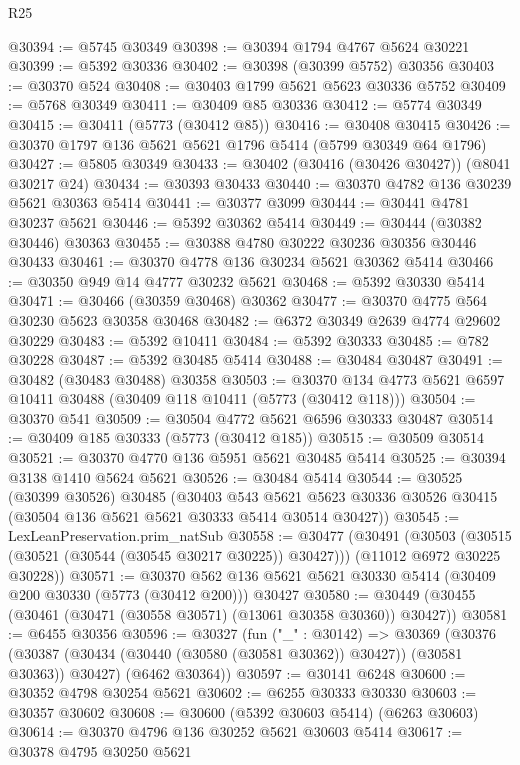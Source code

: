 \begin{lexlean}{R25}
\begin{coremodule}
@30394 := @5745 @30349
@30398 := @30394 @1794 @4767 @5624 @30221
@30399 := @5392 @30336
@30402 := @30398 (@30399 @5752) @30356
@30403 := @30370 @524
@30408 := @30403 @1799 @5621 @5623 @30336 @5752
@30409 := @5768 @30349
@30411 := @30409 @85 @30336
@30412 := @5774 @30349
@30415 := @30411 (@5773 (@30412 @85))
@30416 := @30408 @30415
@30426 := @30370 @1797 @136 @5621 @5621 @1796 @5414 (@5799 @30349 @64 @1796)
@30427 := @5805 @30349
@30433 := @30402 (@30416 (@30426 @30427)) (@8041 @30217 @24)
@30434 := @30393 @30433
@30440 := @30370 @4782 @136 @30239 @5621 @30363 @5414
@30441 := @30377 @3099
@30444 := @30441 @4781 @30237 @5621
@30446 := @5392 @30362 @5414
@30449 := @30444 (@30382 @30446) @30363
@30455 := @30388 @4780 @30222 @30236 @30356 @30446 @30433
@30461 := @30370 @4778 @136 @30234 @5621 @30362 @5414
@30466 := @30350 @949 @14 @4777 @30232 @5621
@30468 := @5392 @30330 @5414
@30471 := @30466 (@30359 @30468) @30362
@30477 := @30370 @4775 @564 @30230 @5623 @30358 @30468
@30482 := @6372 @30349 @2639 @4774 @29602 @30229
@30483 := @5392 @10411
@30484 := @5392 @30333
@30485 := @782 @30228
@30487 := @5392 @30485 @5414
@30488 := @30484 @30487
@30491 := @30482 (@30483 @30488) @30358
@30503 := @30370 @134 @4773 @5621 @6597 @10411 @30488 (@30409 @118 @10411 (@5773 (@30412 @118)))
@30504 := @30370 @541
@30509 := @30504 @4772 @5621 @6596 @30333 @30487
@30514 := @30409 @185 @30333 (@5773 (@30412 @185))
@30515 := @30509 @30514
@30521 := @30370 @4770 @136 @5951 @5621 @30485 @5414
@30525 := @30394 @3138 @1410 @5624 @5621
@30526 := @30484 @5414
@30544 := @30525
    (@30399 @30526)
    @30485
    (@30403
      @543
      @5621
      @5623
      @30336
      @30526
      @30415
      (@30504 @136 @5621 @5621 @30333 @5414 @30514 @30427))
@30545 := LexLeanPreservation.prim_natSub
@30558 := @30477
    (@30491
      (@30503 (@30515 (@30521 (@30544 (@30545 @30217 @30225)) @30427)))
      (@11012 @6972 @30225 @30228))
@30571 := @30370
    @562
    @136
    @5621
    @5621
    @30330
    @5414
    (@30409 @200 @30330 (@5773 (@30412 @200)))
    @30427
@30580 := @30449 (@30455 (@30461 (@30471 (@30558 @30571) (@13061 @30358 @30360)) @30427))
@30581 := @6455 @30356
@30596 := @30327
    (fun ("_" : @30142) =>
    @30369
      (@30376 (@30387 (@30434 (@30440 (@30580 (@30581 @30362)) @30427)) (@30581 @30363)) @30427)
      (@6462 @30364))
@30597 := @30141 @6248
@30600 := @30352 @4798 @30254 @5621
@30602 := @6255 @30333 @30330
@30603 := @30357 @30602
@30608 := @30600 (@5392 @30603 @5414) (@6263 @30603)
@30614 := @30370 @4796 @136 @30252 @5621 @30603 @5414
@30617 := @30378 @4795 @30250 @5621

\end{coremodule}
\end{lexlean}
